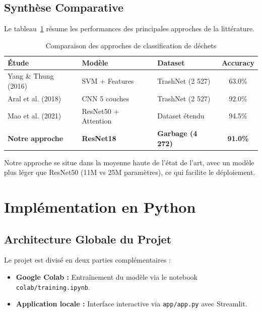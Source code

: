 \documentclass[12pt,a4paper]{report}
\begin{document}
\section{Synthèse Comparative}
Le tableau~\ref{tab:comparison} résume les performances des principales approches de la littérature.

\begin{table}[H]
    \centering
    \caption{Comparaison des approches de classification de déchets}
    \label{tab:comparison}
    \begin{tabular}{lllc}
        \toprule
        \textbf{Étude} & \textbf{Modèle} & \textbf{Dataset} & \textbf{Accuracy} \\
        \midrule
        Yang \& Thung (2016) & SVM + Features & TrashNet (2 527) & 63.0\% \\
        Aral et al. (2018) & CNN 5 couches & TrashNet (2 527) & 92.0\% \\
        Mao et al. (2021) & ResNet50 + Attention & Dataset étendu & 94.5\% \\
        \textbf{Notre approche} & \textbf{ResNet18} & \textbf{Garbage (4 272)} & \textbf{91.0\%} \\
        \bottomrule
    \end{tabular}
\end{table}

Notre approche se situe dans la moyenne haute de l'état de l'art, avec un modèle plus léger que ResNet50 (11M vs 25M paramètres), ce qui facilite le déploiement.

\chapter{Implémentation en Python}

\section{Architecture Globale du Projet}
Le projet est divisé en deux parties complémentaires :

\begin{itemize}
    \item \textbf{Google Colab :} Entraînement du modèle via le notebook \texttt{colab/training.ipynb}.
    \item \textbf{Application locale :} Interface interactive via \texttt{app/app.py} avec Streamlit.
\end{itemize}
\end{document}
